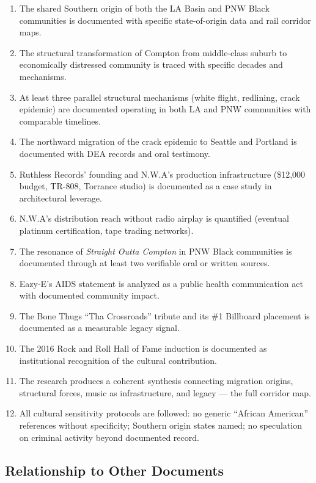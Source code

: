 \documentclass[11pt,letterpaper]{article}
\begin{document}
\begin{enumerate}
  \item The shared Southern origin of both the LA Basin and PNW Black communities is documented with specific state-of-origin data and rail corridor maps.
  \item The structural transformation of Compton from middle-class suburb to economically distressed community is traced with specific decades and mechanisms.
  \item At least three parallel structural mechanisms (white flight, redlining, crack epidemic) are documented operating in both LA and PNW communities with comparable timelines.
  \item The northward migration of the crack epidemic to Seattle and Portland is documented with DEA records and oral testimony.
  \item Ruthless Records' founding and N.W.A's production infrastructure (\$12,000 budget, TR-808, Torrance studio) is documented as a case study in architectural leverage.
  \item N.W.A's distribution reach without radio airplay is quantified (eventual platinum certification, tape trading networks).
  \item The resonance of \textit{Straight Outta Compton} in PNW Black communities is documented through at least two verifiable oral or written sources.
  \item Eazy-E's AIDS statement is analyzed as a public health communication act with documented community impact.
  \item The Bone Thugs ``Tha Crossroads'' tribute and its \#1 Billboard placement is documented as a measurable legacy signal.
  \item The 2016 Rock and Roll Hall of Fame induction is documented as institutional recognition of the cultural contribution.
  \item The research produces a coherent synthesis connecting migration origins, structural forces, music as infrastructure, and legacy --- the full corridor map.
  \item All cultural sensitivity protocols are followed: no generic ``African American'' references without specificity; Southern origin states named; no speculation on criminal activity beyond documented record.
\end{enumerate}

\subsection{Relationship to Other Documents}
\end{document}
